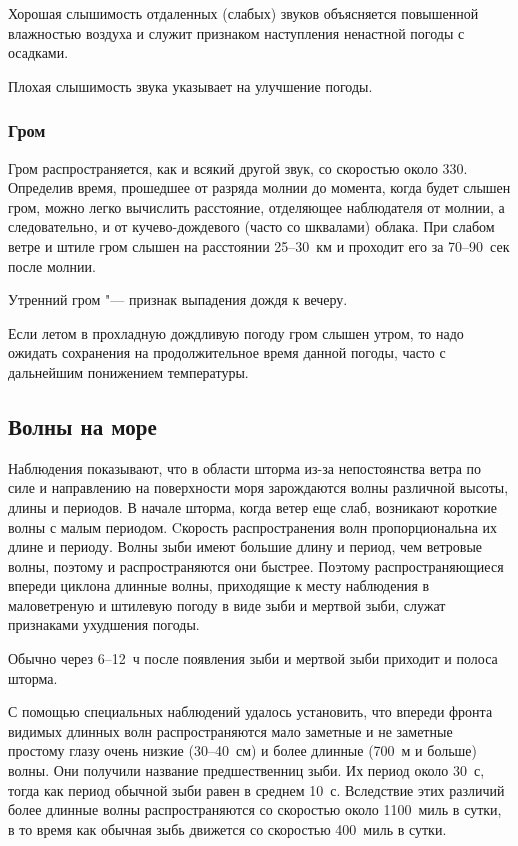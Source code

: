  Хорошая слышимость отдаленных (слабых) звуков объясняется
повышенной влажностью воздуха и служит признаком наступления ненастной
погоды с осадками.

 Плохая слышимость звука указывает на улучшение погоды.

\subsubsection{Гром}

Гром распространяется, как и всякий другой звук, со скоростью около
330\speedms. Определив время, прошедшее от разряда молнии до момента,
когда будет слышен гром, можно легко вычислить расстояние, отделяющее
наблюдателя от молнии, а следовательно, и от кучево-дождевого (часто
со шквалами) облака. При слабом ветре и штиле гром слышен на
расстоянии 25--30~км и проходит его за 70--90~сек после молнии.

 Утренний гром "--- признак выпадения дождя к вечеру.

 Если летом в прохладную дождливую погоду гром слышен утром, то
надо ожидать сохранения на продолжительное время данной погоды, часто
с дальнейшим понижением температуры.

\subsection{Волны на море}\label{sec:waves_on_sea}

Наблюдения показывают, что в области шторма из-за непостоянства ветра
по силе и направлению на поверхности моря зарождаются волны различной
высоты, длины и периодов. В начале шторма, когда ветер еще слаб,
возникают короткие волны с малым периодом. Cкорость распространения
волн пропорциональна их длине и периоду. Волны зыби имеют большие
длину и период, чем ветровые волны, поэтому и распространяются они
быстрее. Поэтому распространяющиеся впереди циклона длинные волны,
приходящие к месту наблюдения в маловетреную и штилевую погоду в виде
зыби и мертвой зыби, служат признаками ухудшения погоды.

Обычно через 6--12~ч после появления зыби и мертвой зыби приходит и
полоса шторма.

С помощью специальных наблюдений удалось установить, что впереди
фронта видимых длинных волн распространяются мало заметные и не
заметные простому глазу очень низкие (30--40~см) и более длинные (700~м
и больше) волны. Они получили название предшественниц зыби. Их период
около 30~с, тогда как период обычной зыби равен в среднем 10~с.
Вследствие этих различий более длинные волны распространяются со
скоростью около 1100~миль в сутки, в то время как обычная зыбь
движется со скоростью 400~миль в сутки.

